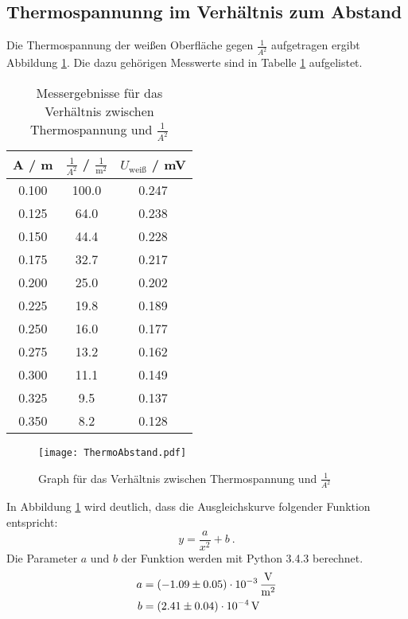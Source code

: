 \subsection{Thermospannunng im Verhältnis zum Abstand}
Die Thermospannung der weißen Oberfläche gegen $\frac{1}{A^2}$ aufgetragen ergibt Abbildung \ref{fig:Abstand}. Die dazu gehörigen Messwerte sind in Tabelle \ref{tab:Abstand} aufgelistet.
\begin{table}[H]
  \centering
  \begin{tabular}{c c c}
      A / m & $\frac{1}{A^2}$ / $\frac{1}{\text{m}^2}$ & $U_\text{weiß}$ / mV \\
    \midrule
      0.100  & 100.0 & 0.247 \\
      0.125	& 64.0   & 0.238 \\
      0.150	& 44.4   & 0.228 \\
      0.175	& 32.7   & 0.217 \\
      0.200	& 25.0   & 0.202 \\
      0.225	& 19.8   & 0.189 \\
      0.250	& 16.0   & 0.177 \\
      0.275	& 13.2   & 0.162 \\
      0.300	& 11.1   & 0.149 \\
      0.325	& 9.5    & 0.137 \\
      0.350	& 8.2    & 0.128 \\
  \end{tabular}
  \caption{Messergebnisse für das Verhältnis zwischen Thermospannung und $\frac{1}{A^2}$}
  \label{tab:Abstand}
\end{table}

\begin{figure}[H]
  \centering
  \texttt{[image: ThermoAbstand.pdf]}
  \caption{Graph für das Verhältnis zwischen Thermospannung und $\frac{1}{A^2}$}
  \label{fig:Abstand}
\end{figure}
In Abbildung \ref{tab:Abstand} wird deutlich, dass die Ausgleichskurve folgender Funktion entspricht:
\begin{equation}
  y = \frac{a}{x^2} + b \ .
\end{equation}
Die Parameter $a$ und $b$ der Funktion werden mit Python 3.4.3 berechnet.
\begin{align}
  a &= (\num{-1.09 +- 0.05}) \cdot 10^{-3} \, \frac{\text{V}}{\text{m}^2} \\
  b &= (\num{2.41 +- 0.04}) \cdot 10^{-4} \, \text{V}
\end{align}
